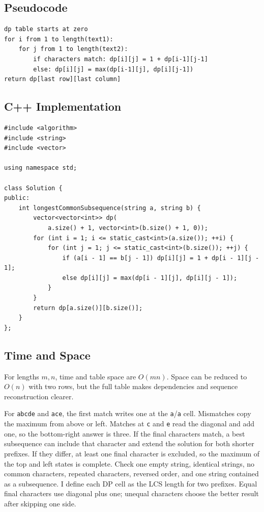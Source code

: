 \subsection{Pseudocode}
\begin{lstlisting}[style=pseudocode]
dp table starts at zero
for i from 1 to length(text1):
    for j from 1 to length(text2):
        if characters match: dp[i][j] = 1 + dp[i-1][j-1]
        else: dp[i][j] = max(dp[i-1][j], dp[i][j-1])
return dp[last row][last column]
\end{lstlisting}

\subsection{C++ Implementation}
\begin{lstlisting}[style=compactcode,caption={Complete C++ solution: Longest Common Subsequence}]
#include <algorithm>
#include <string>
#include <vector>

using namespace std;

class Solution {
public:
    int longestCommonSubsequence(string a, string b) {
        vector<vector<int>> dp(
            a.size() + 1, vector<int>(b.size() + 1, 0));
        for (int i = 1; i <= static_cast<int>(a.size()); ++i) {
            for (int j = 1; j <= static_cast<int>(b.size()); ++j) {
                if (a[i - 1] == b[j - 1]) dp[i][j] = 1 + dp[i - 1][j - 1];
                else dp[i][j] = max(dp[i - 1][j], dp[i][j - 1]);
            }
        }
        return dp[a.size()][b.size()];
    }
};
\end{lstlisting}

\subsection{Time and Space}
For lengths \(m,n\), time and table space are \(O(mn)\). Space can be reduced
to \(O(n)\) with two rows, but the full table makes dependencies and sequence
reconstruction clearer.

\lessonexpansion
  {For \texttt{abcde} and \texttt{ace}, the first match writes one at the
   \texttt{a}/\texttt{a} cell. Mismatches copy the maximum from above or left.
   Matches at \texttt{c} and \texttt{e} read the diagonal and add one, so the
   bottom-right answer is three.}
  {If the final characters match, a best subsequence can include that
   character and extend the solution for both shorter prefixes. If they differ,
   at least one final character is excluded, so the maximum of the top and
   left states is complete.}
  {Check one empty string, identical strings, no common characters, repeated
   characters, reversed order, and one string contained as a subsequence.}
  {I define each DP cell as the LCS length for two prefixes. Equal final
   characters use diagonal plus one; unequal characters choose the better
   result after skipping one side.}

